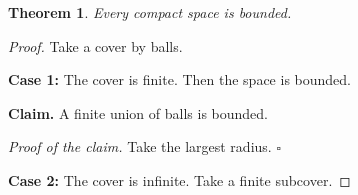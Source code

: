\documentclass{article}
\newtheorem{theorem}{Theorem}
\begin{document}
\begin{theorem}
Every compact space is bounded.
\end{theorem}
\begin{proof}
 Take a cover by balls.

\textbf{Case 1:} The cover is finite. Then the space is bounded.

\textbf{Claim.} A finite union of balls is bounded.

\emph{Proof of the claim.} Take the largest radius. $\square$

\textbf{Case 2:} The cover is infinite. Take a finite subcover.
\end{proof}
\end{document}
